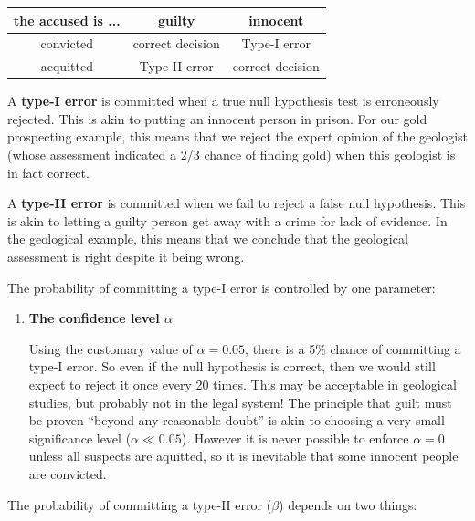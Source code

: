 \begin{center}
\begin{tabular}{c|cc}
  the accused is ... & guilty & innocent \\ \hline
  convicted & correct decision & Type-I error \\
  acquitted & Type-II error & correct decision
\end{tabular}
\end{center}

A \textbf{type-I error} is committed when a true null hypothesis test
is erroneously rejected. This is akin to putting an innocent person in
prison. For our gold prospecting example, this means that we reject
the expert opinion of the geologist (whose assessment indicated a 2/3
chance of finding gold) when this geologist is in fact
correct.\medskip

A \textbf{type-II error} is committed when we fail to reject a false
null hypothesis.  This is akin to letting a guilty person get away
with a crime for lack of evidence. In the geological example, this
means that we conclude that the geological assessment is right despite
it being wrong.\medskip

The probability of committing a type-I error is controlled by one
parameter:

\begin{enumerate}
\item {\bf The confidence level $\alpha$}
  
  Using the customary value of $\alpha=0.05$, there is a 5\% chance of
  committing a type-I error. So even if the null hypothesis is
  correct, then we would still expect to reject it once every 20
  times. This may be acceptable in geological studies, but probably
  not in the legal system! The principle that guilt must be proven
  ``beyond any reasonable doubt'' is akin to choosing a very small
  significance level ($\alpha\ll{0.05}$). However it is never possible
  to enforce $\alpha=0$ unless all suspects are aquitted, so it is
  inevitable that some innocent people are convicted.
\end{enumerate}

The probability of committing a type-II error ($\beta$) depends on two
things:

